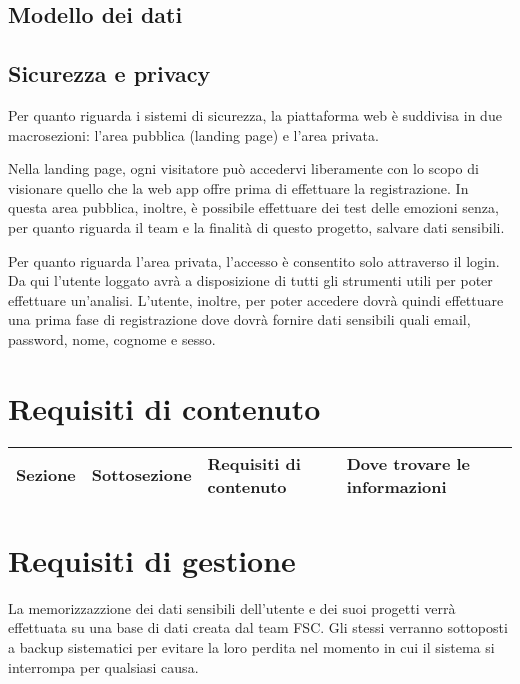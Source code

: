 \subsection{Modello dei dati}

\subsection{Sicurezza e privacy}
Per quanto riguarda i sistemi di sicurezza, la piattaforma web è suddivisa in 
due macrosezioni: l'area pubblica (landing page) e l'area privata.

Nella landing page, ogni visitatore può accedervi liberamente con lo scopo di 
visionare quello che la web app offre prima di effettuare la registrazione. In 
questa area pubblica, inoltre, è possibile effettuare dei test delle emozioni 
senza, per quanto riguarda il team e la finalità di questo progetto, salvare 
dati sensibili.

Per quanto riguarda l'area privata, l'accesso è consentito solo attraverso il 
login. Da qui l'utente loggato avrà a disposizione di tutti gli strumenti utili 
per poter effettuare un'analisi. L'utente, inoltre, per poter accedere dovrà 
quindi effettuare una prima fase di registrazione dove dovrà fornire dati 
sensibili quali email, password, nome, cognome e sesso.

\section{Requisiti di contenuto}\label{sec:requisiti-di-contenuto}

\begin{table}[H]
	\centering
	\caption{I bisogni degli utenti di Emotionally.}
	\label{tab:bisogni-utenti}
	\begin{longtable}{@{}|>{\centering\arraybackslash}m{}|m{}|m{}|>{\centering\arraybackslash}m{}|@{}}
		\hline
		\rowcolor{emotionally-color}
		{\color{white} \textbf{Sezione}}   & {\color{white} 
		\textbf{Sottosezione}}     & {\color{white} \textbf{Requisiti di 
		contenuto}} & {\color{white} \textbf{Dove trovare le informazioni}} 
		\\\hline
		\endfirsthead
		\hline
	\end{longtable}
\end{table}

\section{Requisiti di gestione}\label{sec:requisiti-di-gestione}
La memorizzazzione dei dati sensibili dell'utente e dei suoi progetti verrà 
effettuata su una base di dati creata dal team FSC. Gli stessi verranno 
sottoposti a backup sistematici per evitare la loro perdita nel momento in cui 
il sistema si interrompa per qualsiasi causa.

